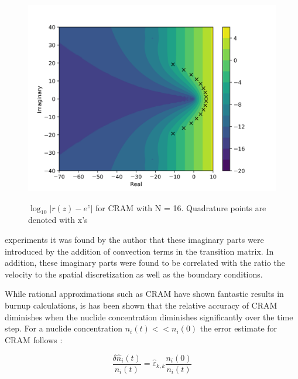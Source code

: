 \begin{figure}[p]
  \centering
  \includegraphics[width=5in]{images/chapter-3/RationApproxCRAMError16.png}\\
  \caption{$\log_{10}|r(z)-e^{z}|$ for CRAM with N = 16. Quadrature points are denoted with x's}
  \label{fig:complexRationalApproxCRAM}
\end{figure} 

\clearpage

\noindent experiments it was found by the author that these imaginary parts were introduced by the addition of convection terms in the transition matrix. In addition, these imaginary parts were found to be correlated with the ratio the velocity to the spatial discretization as well as the boundary conditions. 

While rational approximations such as CRAM have shown fantastic results in burnup calculations, is has been shown that the relative accuracy of CRAM diminishes when the nuclide concentration diminishes significantly over the time step. For a nuclide concentration $n_{i}(t) << n_{i}(0)$ the error estimate for CRAM follows \cite{isotalo2016}:

\begin{equation}
    \frac{\delta \hat{n}_{i}(t)}{n_{i}(t)} = \hat{\varepsilon}_{k,k} \frac{n_{i}(0)}{n_{i}(t)}
    \label{eq:CRAMError}
\end{equation}

